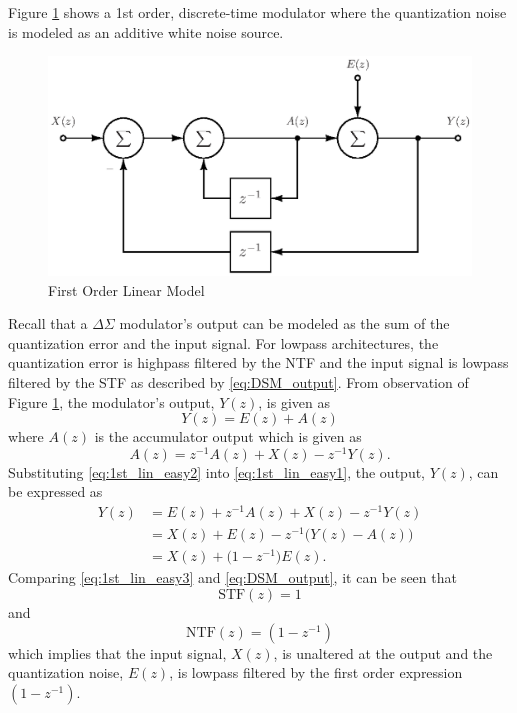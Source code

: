 Figure  \ref{fig:linear_z_model_1} shows a 1st order, discrete-time \DS modulator where 
the quantization noise is modeled as an additive white noise source. 
\begin{figure}[htbp]
 \centering
 \includegraphics{./final_figures/first_order_simple.eps}
 \caption{First Order Linear Model}
 \label{fig:linear_z_model_1}
\end{figure}
Recall that a $\Delta\Sigma$ modulator's output can be modeled as the sum of the
quantization error and the input signal. For lowpass architectures, the quantization error
is highpass filtered by the NTF and the input signal is lowpass filtered by the STF as
described by \eqref{eq:DSM_output}. From observation of Figure \ref{fig:linear_z_model_1},
the \DS modulator's output, $Y(z)$, is given as
\begin{equation}\label{eq:1st_lin_easy1}
 Y(z)=E(z)+A(z)
\end{equation}
where $A(z)$ is the accumulator output which is given as 
\begin{equation}\label{eq:1st_lin_easy2}
 A(z)=z^{-1}A(z)+X(z)-z^{-1}Y(z)\text{.}
\end{equation}
Substituting \eqref{eq:1st_lin_easy2} into \eqref{eq:1st_lin_easy1}, the output,
$Y(z)$, can be expressed as 
\begin{equation}\label{eq:1st_lin_easy3}
 \begin{split}
  Y(z) &= E(z)+z^{-1}A(z)+X(z)-z^{-1}Y(z)\\
       &= X(z)+E(z)-z^{-1}\bigl(Y(z)-A(z)\bigr)\\
       &= X(z)+\bigl(1-z^{-1}\bigr)E(z)\text{.}
 \end{split}
\end{equation}
Comparing \eqref{eq:1st_lin_easy3} and \eqref{eq:DSM_output}, it can be seen that
\begin{equation}\label{eq:first_order_STF}
   \text{STF}(z)=1
\end{equation}
and
\begin{equation}\label{eq:first_order_NTF}
   \text{NTF}(z)=\left(1-z^{-1}\right)
\end{equation}
which implies that the input signal, $X(z)$, is unaltered at the output and the
quantization noise, $E(z)$, is lowpass filtered by the first order expression
$\left(1-z^{-1}\right)$.

